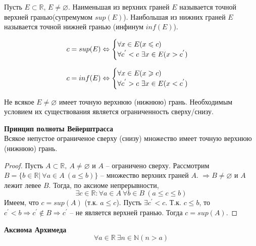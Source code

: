     \begin{definition}
        Пусть $E \subset \mathds{R}$, $E \neq \varnothing$.  Наименьшая из верхних граней $E$ называется точной верхней гранью(супремумом $sup(E)$). Наибольшая из нижних граней $E$ называется точной нижней гранью (инфинум $inf(E)$). 
    \end{definition}
    
    \[c = sup(E) \Leftrightarrow
    \begin{cases}
        \forall x \in E (x \leqslant c)
        \\
        \forall c^{'} < c \  \exists x \in E (x > c^{'})
    \end{cases}\]
    
    \[c = inf(E) \Leftrightarrow
    \begin{cases}
        \forall x \in E (x \geqslant c)
        \\
        \forall c^{'} > c \  \exists x \in E (x < c^{'})
    \end{cases}\]
    
    \begin{note}
        Не всякое $E \neq \varnothing$ имеет точную верхнюю (нижнюю) грань. Необходимым условием их существования является ограниченность сверху/снизу.
    \end{note}
    
    \begin{theorem}
        \textbf{Принцип полноты Вейерштрасса}
        \\
        Всякое непустое ограниченое сверху (снизу) множество имеет точную верхнюю (нижнюю) грань.
    \end{theorem}
    
    \begin{proof}
        Пусть $A \subset \mathds{R}, \ A \neq \varnothing$ и $A$ -- ограничено сверху. Рассмотрим $B = \{b \in \mathds{R}| \ \forall a \in A \  (a \leq b)\}$ -- множество верхних граней $A$. $\Rightarrow B \neq \varnothing$ и $A$ лежит левее $B$. Тогда, по аксиоме непрерывности, 
        \[\exists c \in \mathds{R}: \forall a \in A \ \forall b \in B \ (a \leq c \leq b)\]
        Имеем, что $c = sup(A)$ (т.к. $a \leq c$). Пусть $\exists c^{'} < c$. Т.к. $c \leq b$, то $c^{'} < b \Rightarrow c^{'} \notin B \Rightarrow c^{'}$ -- не является верхней гранью. Тогда $c = sup(A)$.
    \end{proof}
    
    \begin{theorem}
        \textbf{Аксиома Архимеда}
        \[\forall a \in \mathds{R} \ \exists n \in \mathds{N} (n > a)\]
    \end{theorem}
    
